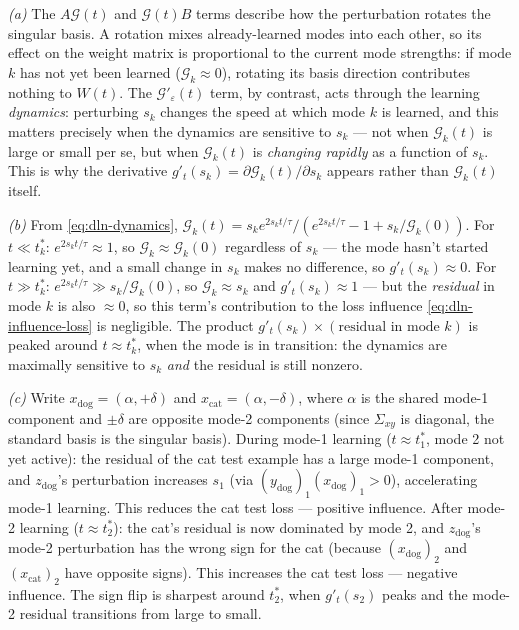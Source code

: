\documentclass[11pt]{article}
\begin{document}
\begin{solution}

\textit{(a)} The $A\mathcal{G}(t)$ and $\mathcal{G}(t)B$ terms describe how the perturbation rotates the singular basis. A rotation mixes already-learned modes into each other, so its effect on the weight matrix is proportional to the current mode strengths: if mode $k$ has not yet been learned ($\mathcal{G}_k \approx 0$), rotating its basis direction contributes nothing to $W(t)$. The $\mathcal{G}'_\varepsilon(t)$ term, by contrast, acts through the learning \emph{dynamics}: perturbing $s_k$ changes the speed at which mode $k$ is learned, and this matters precisely when the dynamics are sensitive to $s_k$ --- not when $\mathcal{G}_k(t)$ is large or small per se, but when $\mathcal{G}_k(t)$ is \emph{changing rapidly} as a function of $s_k$. This is why the derivative $g'_t(s_k) = \partial\mathcal{G}_k(t)/\partial s_k$ appears rather than $\mathcal{G}_k(t)$ itself.

\textit{(b)} From \eqref{eq:dln-dynamics}, $\mathcal{G}_k(t) = s_k e^{2s_k t/\tau}/(e^{2s_k t/\tau} - 1 + s_k/\mathcal{G}_k(0))$. For $t \ll t_k^*$: $e^{2s_k t/\tau} \approx 1$, so $\mathcal{G}_k \approx \mathcal{G}_k(0)$ regardless of $s_k$ --- the mode hasn't started learning yet, and a small change in $s_k$ makes no difference, so $g'_t(s_k) \approx 0$. For $t \gg t_k^*$: $e^{2s_k t/\tau} \gg s_k/\mathcal{G}_k(0)$, so $\mathcal{G}_k \approx s_k$ and $g'_t(s_k) \approx 1$ --- but the \emph{residual} in mode $k$ is also $\approx 0$, so this term's contribution to the loss influence \eqref{eq:dln-influence-loss} is negligible. The product $g'_t(s_k) \times (\text{residual in mode } k)$ is peaked around $t \approx t_k^*$, when the mode is in transition: the dynamics are maximally sensitive to $s_k$ \emph{and} the residual is still nonzero.

\textit{(c)} Write $x_{\mathrm{dog}} = (\alpha, +\delta)$ and $x_{\mathrm{cat}} = (\alpha, -\delta)$, where $\alpha$ is the shared mode-1 component and $\pm\delta$ are opposite mode-2 components (since $\Sigma_{xy}$ is diagonal, the standard basis is the singular basis). During mode-1 learning ($t \approx t_1^*$, mode 2 not yet active): the residual of the cat test example has a large mode-1 component, and $z_{\mathrm{dog}}$'s perturbation increases $s_1$ (via $(y_{\mathrm{dog}})_1 (x_{\mathrm{dog}})_1 > 0$), accelerating mode-1 learning. This reduces the cat test loss --- positive influence. After mode-2 learning ($t \approx t_2^*$): the cat's residual is now dominated by mode 2, and $z_{\mathrm{dog}}$'s mode-2 perturbation has the wrong sign for the cat (because $(x_{\mathrm{dog}})_2$ and $(x_{\mathrm{cat}})_2$ have opposite signs). This increases the cat test loss --- negative influence. The sign flip is sharpest around $t_2^*$, when $g'_t(s_2)$ peaks and the mode-2 residual transitions from large to small.
\end{solution}
\end{document}
